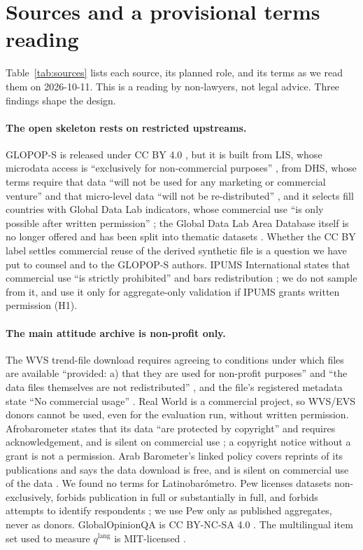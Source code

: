 \documentclass[10pt]{article}
\begin{document}
\section{Sources and a provisional terms reading}
\label{sec:sources}

Table~\ref{tab:sources} lists each source, its planned role, and its terms as we read them on 2026-10-11. This is a reading by non-lawyers, not legal advice. Three findings shape the design.

\paragraph{The open skeleton rests on restricted upstreams.} GLOPOP-S is released under CC BY 4.0 \citep{glopopdataverse}, but it is built from LIS, whose microdata access is ``exclusively for non-commercial purposes'' \citep{lisaccess}, from DHS, whose terms require that data ``will not be used for any marketing or commercial venture'' and that micro-level data ``will not be re-distributed'' \citep{dhsterms}, and it selects fill countries with Global Data Lab indicators, whose commercial use ``is only possible after written permission'' \citep{gdlterms}; the Global Data Lab Area Database itself is no longer offered and has been split into thematic datasets \citep{gdlareadata}. Whether the CC BY label settles commercial reuse of the derived synthetic file is a question we have put to counsel and to the GLOPOP-S authors. IPUMS International states that commercial use ``is strictly prohibited'' and bars redistribution \citep{ipumsterms}; we do not sample from it, and use it only for aggregate-only validation if IPUMS grants written permission (H1).

\paragraph{The main attitude archive is non-profit only.} The WVS trend-file download requires agreeing to conditions under which files are available ``provided: a) that they are used for non-profit purposes'' and ``the data files themselves are not redistributed'' \citep{wvsconditions}, and the file's registered metadata state ``No commercial usage'' \citep{haerpfer2022wvs}. Real World is a commercial project, so WVS/EVS donors cannot be used, even for the evaluation run, without written permission. Afrobarometer states that its data ``are protected by copyright'' and requires acknowledgement, and is silent on commercial use \citep{afropolicy}; a copyright notice without a grant is not a permission. Arab Barometer's linked policy covers reprints of its publications and says the data download is free, and is silent on commercial use of the data \citep{arabpolicy}. We found no terms for Latinobarómetro. Pew licenses datasets non-exclusively, forbids publication in full or substantially in full, and forbids attempts to identify respondents \citep{pewterms}; we use Pew only as published aggregates, never as donors. GlobalOpinionQA is CC BY-NC-SA 4.0 \citep{globalopinionshf}. The multilingual item set used to measure $q^{\text{lang}}$ is MIT-licensed \citep{mmmlu}.
\end{document}
